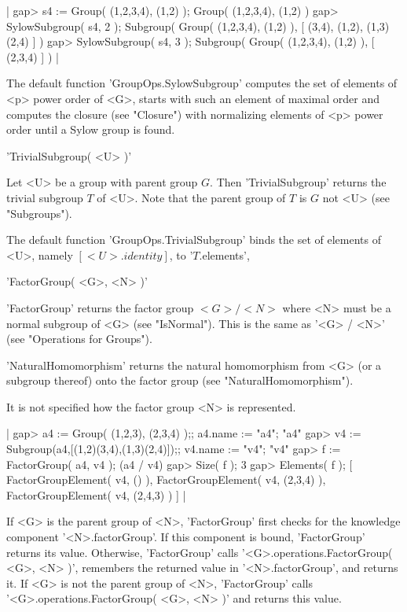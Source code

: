 |    gap> s4 := Group( (1,2,3,4), (1,2) );
    Group( (1,2,3,4), (1,2) )
    gap> SylowSubgroup( s4, 2 );
    Subgroup( Group( (1,2,3,4), (1,2) ), [ (3,4), (1,2), (1,3)(2,4) ] )
    gap> SylowSubgroup( s4, 3 );
    Subgroup( Group( (1,2,3,4), (1,2) ), [ (2,3,4) ] ) |

The  default  function   'GroupOps.SylowSubgroup' computes  the   set  of
elements of  <p> power  order  of <G>,  starts  with such an element   of
maximal order and computes the  closure (see  "Closure") with normalizing
elements of <p> power order until a Sylow group is found.


'TrivialSubgroup( <U> )'

Let <U> be a group with parent group $G$. Then  'TrivialSubgroup' returns
the trivial subgroup $T$ of <U>. Note that the parent group of $T$ is $G$
not <U> (see "Subgroups").

The default function 'GroupOps.TrivialSubgroup' binds the set of elements
of <U>, namely $[ <U>.identity ]$, to '$T$.elements',


'FactorGroup( <G>, <N> )'

'FactorGroup' returns the factor group $<G> /  <N>$  where <N> must  be a
normal subgroup of <G> (see "IsNormal").  This is the same as '<G> / <N>'
(see "Operations for Groups").

'NaturalHomomorphism' returns the  natural  homomorphism  from  <G> (or a
subgroup thereof) onto the factor group (see "NaturalHomomorphism").

It is not specified how the factor group <N> is represented.

|    gap> a4 := Group( (1,2,3), (2,3,4) );;  a4.name := "a4";
    "a4"
    gap> v4 := Subgroup(a4,[(1,2)(3,4),(1,3)(2,4)]);;  v4.name := "v4";
    "v4"
    gap> f := FactorGroup( a4, v4 );
    (a4 / v4)
    gap> Size( f );
    3
    gap> Elements( f );
    [ FactorGroupElement( v4, () ), FactorGroupElement( v4, (2,3,4) ), 
      FactorGroupElement( v4, (2,4,3) ) ] |

If <G> is the parent group of  <N>,  'FactorGroup'  first checks  for the
knowledge  component  '<N>.factorGroup'.   If  this component  is  bound,
'FactorGroup'  returns  its   value.    Otherwise,   'FactorGroup'  calls
'<G>.operations.FactorGroup( <G>, <N> )', remembers the returned value in
'<N>.factorGroup',  and returns it.  If  <G>  is not  the parent group of
<N>,  'FactorGroup' calls  '<G>.operations.FactorGroup(  <G>, <N> )'  and
returns this value.

